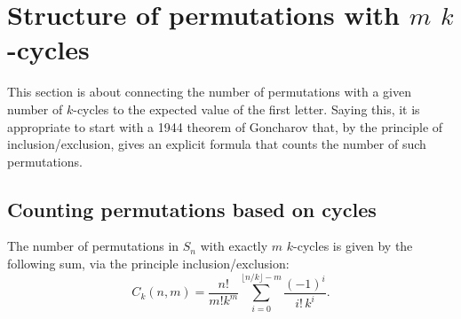 \section{Structure of permutations with \texorpdfstring{$m$}{m} \texorpdfstring{$k$}{k}-cycles}
\label{section:recursiveStructure}
This section is about connecting the number of permutations with a given number of
$k$-cycles to the expected value of the first letter. Saying this, it is
appropriate to start with a 1944 theorem of Goncharov that, by the principle of
inclusion/exclusion, gives an explicit formula that counts the number of such
permutations.
\subsection{Counting permutations based on cycles}
\begin{theorem}
  \label{GoncharovTheorem}
  The number of permutations in $S_n$ with exactly $m$ $k$-cycles is given by
  the following sum, via the principle inclusion/exclusion:
  \begin{equation}
    C_k(n,m)
    = \frac{n!}{m!k^m}\sum_{i=0}^{\lfloor n/k \rfloor - m} \frac{(-1)^i}{i!\,k^i}.
  \end{equation}
  \label{eq:Goncharov}
\end{theorem}

